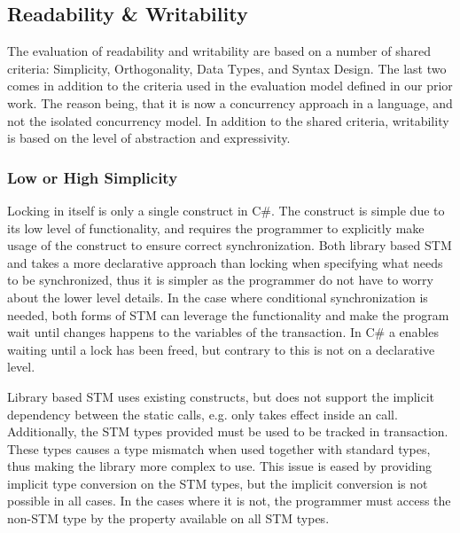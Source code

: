 \subsection{Readability \& Writability}\label{subsec:tl_charac_read_and_write}
The evaluation of readability and writability are based on a number of shared criteria: Simplicity, Orthogonality, Data Types, and Syntax Design. The last two comes in addition to the criteria used in the evaluation model defined in our prior work\cite[p. 16-21]{dpt907e14trending}. The reason being, that it is now a concurrency approach in a language, and not the isolated concurrency model. In addition to the shared criteria, writability is based on the level of abstraction and expressivity.
\subsubsection{Low or High Simplicity}\label{subsec:simplicity}
Locking in itself is only a single construct in C\#. The construct is simple due to its low level of functionality, and requires the programmer to explicitly make usage of the construct to ensure correct synchronization. Both library based \ac{STM} and \stmname takes a more declarative approach than locking when specifying what needs to be synchronized, thus it is simpler as the programmer do not have to worry about the lower level details. In the case where conditional synchronization is needed, both forms of \ac{STM} can leverage the  functionality and make the program wait until changes happens to the variables of the transaction. In C\# a  enables waiting until a lock has been freed, but contrary to  this is not on a declarative level.

Library based \ac{STM} uses existing constructs, but does not support the implicit dependency between the static calls, e.g.  only takes effect inside an  call. Additionally, the \ac{STM} types provided must be used to be tracked in transaction. These types causes a type mismatch when used together with standard types, thus making the library more complex to use. This issue is eased by providing implicit type conversion on the \ac{STM} types, but the implicit conversion is not possible in all cases. In the cases where it is not, the programmer must access the non-\ac{STM} type by the  property available on all \ac{STM} types. 


